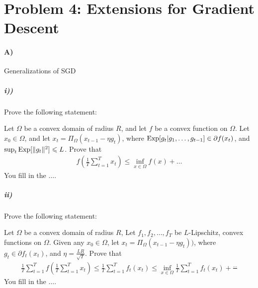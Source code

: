 \documentclass[12pt]{article}
\begin{document}
\section*{Problem 4: Extensions for Gradient Descent}
\paragraph{A)} Generalizations of SGD
\subparagraph{i))} Prove the following statement:
\begin{proposition*} Let $\Omega$ be a convex domain of radius $R$, and let $f$ be a convex function on $\Omega$. Let $x_0 \in \Omega$, and let $x_{t} = \Pi_{\Omega}(x_{t-1} - \eta g_t )$, where $\mathrm{Exp}[g_t | g_1,\dots,g_{t-1}] \in \partial f(x_t)$, and $\sup_{t} \mathrm{Exp}[\|g_t\|^2] \leqslant L$.  Prove that 
\begin{eqnarray}
 f(\frac{1}{T}\sum_{t=1}^T x_t) \le \inf_{x \in \Omega} f(x) + \dots
\end{eqnarray}
You fill in the $\dots$.
\end{proposition*}
\subparagraph{ii)} Prove the following statement:
\begin{proposition*}  Let $\Omega$ be a convex domain of radius $R$, Let $f_1,f_2,\dots,f_T$ be $L$-Lipschitz, convex functions on $\Omega$. Given any $x_0 \in \Omega$, let $x_{t} = \Pi_{\Omega}(x_{t-1} - \eta g_t ))$, where $g_t \in \partial f_t(x_t)$, and  $\eta = \frac{LR}{\sqrt{T}}$. Prove that
\begin{eqnarray}
\frac{1}{T}\sum_{t=1}^{T} f(\frac{1}{T}\sum_{t=1}^T x_t) \le \frac{1}{T}\sum_{t=1}^Tf_t(x_t) \le \inf_{x \in \Omega}\frac{1}{T}\sum_{t=1}^Tf_t(x_t) + \frac{\dots}{}
\end{eqnarray}
You fill in the $\dots$.
\end{proposition*}
\end{document}

